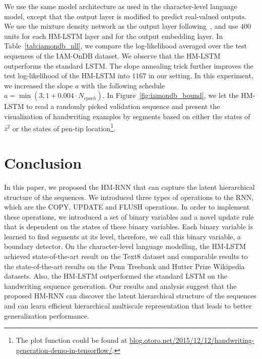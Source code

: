 We use the same model architecture as used in the character-level language model, except that the output layer is modified to predict real-valued outputs. We use the mixture density network as the output layer following~\citet{graves2013generating},
and use $400$ units for each HM-LSTM layer and for the output embedding layer. In Table~\ref{tab:iamondb_nll}, we compare the log-likelihood averaged over the test sequences of the IAM-OnDB dataset. We observe that the HM-LSTM outperforms the standard LSTM. The slope annealing trick further improves the test log-likelihood of the HM-LSTM into $1167$ in our setting. In this experiment, we increased the slope $a$ with the following schedule {\small $a=\min\left(3, 1+0.004\cdot N_{epoch}\right)$}.
In Figure~\ref{fig:iamondb_bound}, we let the HM-LSTM to read a randomly picked validation sequence and present the visualization of handwriting examples by segments based on either the states of $z^2$ or the states of pen-tip location\footnote{\scriptsize The plot function could be found at \url{blog.otoro.net/2015/12/12/handwriting-generation-demo-in-tensorflow/}.}.

\section{Conclusion}
\label{sec:conclusion}
In this paper, we proposed the HM-RNN that can capture the latent hierarchical structure of the sequences. We introduced three types of operations to the RNN, which are the COPY, UPDATE and FLUSH operations. In order to implement these operations, we introduced a set of binary variables and a novel update rule that is dependent on the states of these binary variables. Each binary variable is learned to find segments at its level, therefore, we call this binary variable, a boundary detector. On the character-level language modelling, the HM-LSTM achieved state-of-the-art result on the Text8 dataset and comparable results to the state-of-the-art results on the Penn Treebank and Hutter Prize Wikipedia datasets. Also, the HM-LSTM outperformed the standard LSTM on the handwriting sequence generation. Our results and analysis suggest that the proposed HM-RNN can discover the latent hierarchical structure of the sequences and can learn efficient hierarchical multiscale representation that leads to better generalization performance.


